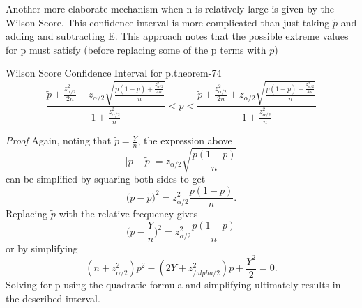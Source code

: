 \documentclass[10pt,]{book}
\makeatletter
\renewcommand*{\proofname}{Proof}
\renewenvironment{proof}[1][\proofname]{\par
  \pushQED{\qed}%
  \normalfont \topsep6\p@\@plus6\p@\relax
  \trivlist
  \item\relax
    {\itshape
    #1\@addpunct{.}}\hspace\labelsep\ignorespaces
}{%
  \popQED\endtrivlist\@endpefalse
}
\numberwithin{equation}{section}
\newcommand{\lt}{<}
\makeatother
\begin{document}
\par
\hypertarget{p-1119}{}%
Another more elaborate mechanism when n is relatively large is given by the Wilson Score. This confidence interval is more complicated than just taking \(\tilde{p}\) and adding and subtracting E. This approach notes that the possible extreme values for p must satisfy (before replacing some of the p terms with \(\tilde{p}\))%
\par
\hypertarget{p-1120}{}%
\begin{theorem}{Wilson Score Confidence Interval for p.}{}{theorem-74}%
\hypertarget{p-1121}{}%
%
\begin{equation*}
\frac{\tilde{p} + \frac{z_{\alpha/2}^2}{2n} - z_{\alpha/2} \sqrt{\frac{\tilde{p}(1-\tilde{p}) + \frac{z_{\alpha/2}^2}{4n}}{n}}}{1 + \frac{z_{\alpha/2}^2}{n}} \lt p \lt \frac{\tilde{p} + \frac{z_{\alpha/2}^2}{2n} + z_{\alpha/2} \sqrt{\frac{\tilde{p}(1-\tilde{p}) + \frac{z_{\alpha/2}^2}{4n}}{n}}}{1 + \frac{z_{\alpha/2}^2}{n}}
\end{equation*}
%
\end{theorem}
\begin{proof}\hypertarget{proof-72}{}
\hypertarget{p-1122}{}%
Again, noting that \(\tilde{p} = \frac{Y}{n}\), the expression above%
\begin{equation*}
\big | p - \tilde{p} \big | = z_{\alpha /2} \sqrt{\frac{p(1-p)}{n}}
\end{equation*}
can be simplified by squaring both sides to get%
\begin{equation*}
\big ( p - \tilde{p} \big )^2 = z_{\alpha /2}^2 \frac{p(1-p)}{n}.
\end{equation*}
Replacing \(\tilde{p}\) with the relative frequency gives%
\begin{equation*}
\big ( p - \frac{Y}{n} \big )^2 = z_{\alpha /2}^2 \frac{p(1-p)}{n}
\end{equation*}
or by simplifying%
\begin{equation*}
(n+z_{\alpha /2}^2 )p^2 - (2Y+z_{/alpha /2}^2) p + \frac{Y^2}{2} = 0.
\end{equation*}
Solving for p using the quadratic formula and simplifying ultimately results in the described interval.%
\end{proof}
\end{document}
